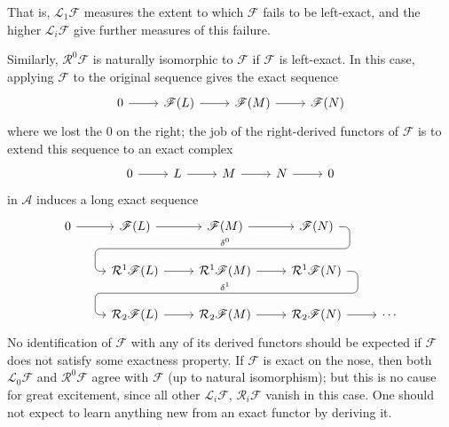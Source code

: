 That is, $\mathcal{L}_1\mathscr{F}$ measures the extent to which $\mathscr{F}$ fails to be left-exact, and the higher $\mathcal{L}_i\mathscr{F}$ give further measures of this failure.\par
Similarly, $\mathcal{R}^0\mathscr{F}$ is naturally isomorphic to $\mathscr{F}$ if $\mathscr{F}$ is left-exact. In this case, applying $\mathscr{F}$ to the original sequence gives the exact sequence
\[\begin{tikzcd}
0\ar[r]&\mathscr{F}(L)\ar[r]&\mathscr{F}(M)\ar[r]&\mathscr{F}(N)
\end{tikzcd}\]
where we lost the $0$ on the right; the job of the right-derived functors of $\mathscr{F}$ is to extend this sequence to an exact complex
\[\begin{tikzcd}
0\ar[r]&L\ar[r]&M\ar[r]&N\ar[r]&0
\end{tikzcd}\]
in $\mathcal{A}$ induces a long exact sequence
\[\begin{tikzcd}
0\ar[r]&\mathscr{F}(L)\ar[r]&\mathscr{F}(M)\rar
\ar[draw=none]{d}[name=X, anchor=center]{}
&\mathscr{F}(N)\ar[rounded corners,swap,
to path={ -- ([xshift=2ex]\tikztostart.east)
	|- (X.center) \tikztonodes
	-| ([xshift=-2ex]\tikztotarget.west)
	-- (\tikztotarget)}]{dll}[at end]{\delta^0}&\\      
&\mathcal{R}^1\mathscr{F}(L)\rar &\mathcal{R}^1\mathscr{F}(M)\ar[draw=none]{d}[name=Y, anchor=center]{}\rar &\mathcal{R}^1\mathscr{F}(N)\ar[rounded corners,swap,
to path={ -- ([xshift=2ex]\tikztostart.east)
	|- (Y.center) \tikztonodes
	-| ([xshift=-2ex]\tikztotarget.west)
	-- (\tikztotarget)}]{dll}[at end]{\delta^1}&\\
&\mathcal{R}_2\mathscr{F}(L)\rar &\mathcal{R}_2\mathscr{F}(M)\rar &\mathcal{R}_2\mathscr{F}(N)\ar[r]&\cdots
\end{tikzcd}\]
No identification of $\mathscr{F}$ with any of its derived functors should be expected if $\mathscr{F}$ does not satisfy some exactness property. If $\mathscr{F}$ is exact on the nose, then both $\mathcal{L}_0\mathscr{F}$ and $\mathcal{R}^0\mathscr{F}$ agree with $\mathscr{F}$ (up to natural isomorphism); but this is no cause for great
excitement, since all other $\mathcal{L}_i\mathscr{F}$, $\mathcal{R}_i\mathscr{F}$ vanish in this case. One should not expect to learn anything new from an exact functor by deriving it.

